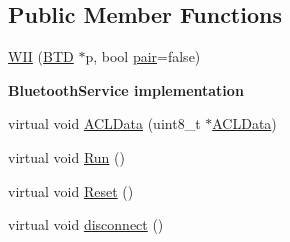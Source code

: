 \subsection*{\-Public \-Member \-Functions}
\begin{DoxyCompactItemize}
\item 
\hyperlink{class_w_i_i_a6597cb0e240a8ccb4ebdb236daef712e}{\-W\-I\-I} (\hyperlink{class_b_t_d}{\-B\-T\-D} $\ast$p, bool \hyperlink{class_w_i_i_a39c3101b26cc549d5258018b3d05c608}{pair}=false)
\end{DoxyCompactItemize}
\begin{Indent}{\bf \-Bluetooth\-Service implementation}\par
\begin{DoxyCompactItemize}
\item 
virtual void \hyperlink{class_w_i_i_a81e1eb4d9ef9999a84e71d764d54dff7}{\-A\-C\-L\-Data} (uint8\-\_\-t $\ast$\hyperlink{class_w_i_i_a81e1eb4d9ef9999a84e71d764d54dff7}{\-A\-C\-L\-Data})
\item 
virtual void \hyperlink{class_w_i_i_ac5cd06f3e9aa2a0d9b9691f00c047e72}{\-Run} ()
\item 
virtual void \hyperlink{class_w_i_i_a769ee2f9a0088da097438bc3cc677f7c}{\-Reset} ()
\item 
virtual void \hyperlink{class_w_i_i_aabe4780f258dada1c0564a4ac7607370}{disconnect} ()
\end{DoxyCompactItemize}
\end{Indent}
